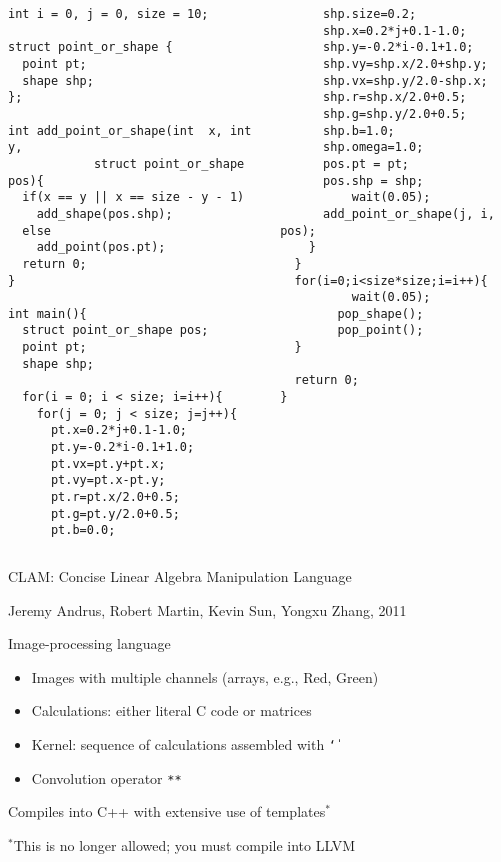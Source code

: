 \documentclass{plt}
\begin{document}
\begin{frame}[fragile]
\begin{columns}
\begin{column}{0.5\textwidth}
\fontsize{7pt}{7pt}\selectfont
\begin{verbatim}
int i = 0, j = 0, size = 10;

struct point_or_shape {
  point pt;
  shape shp;
};

int add_point_or_shape(int  x, int y,
            struct point_or_shape pos){
  if(x == y || x == size - y - 1)
    add_shape(pos.shp);
  else
    add_point(pos.pt);
  return 0;
}

int main(){
  struct point_or_shape pos;
  point pt;
  shape shp;

  for(i = 0; i < size; i=i++){
    for(j = 0; j < size; j=j++){
      pt.x=0.2*j+0.1-1.0;
      pt.y=-0.2*i-0.1+1.0;
      pt.vx=pt.y+pt.x;
      pt.vy=pt.x-pt.y;
      pt.r=pt.x/2.0+0.5;
      pt.g=pt.y/2.0+0.5;
      pt.b=0.0;
\end{verbatim}
\end{column}
\begin{column}{0.5\textwidth}
\fontsize{7pt}{7pt}\selectfont
\begin{verbatim}
      shp.size=0.2;
      shp.x=0.2*j+0.1-1.0;
      shp.y=-0.2*i-0.1+1.0;
      shp.vy=shp.x/2.0+shp.y;
      shp.vx=shp.y/2.0-shp.x;
      shp.r=shp.x/2.0+0.5;
      shp.g=shp.y/2.0+0.5;
      shp.b=1.0;
      shp.omega=1.0;
      pos.pt = pt;
      pos.shp = shp;
          wait(0.05);
      add_point_or_shape(j, i, pos);
    }
  }
  for(i=0;i<size*size;i=i++){
          wait(0.05);
        pop_shape();
        pop_point();
  }
 
  return 0;
}
\end{verbatim}
\end{column}
\end{columns}
\end{frame}

\begin{frame}{CLAM: Concise Linear Algebra Manipulation Language}

{\small Jeremy Andrus, Robert Martin, Kevin Sun, Yongxu Zhang, 2011}

Image-processing language

\begin{itemize}
\item Images with multiple channels (arrays, e.g., Red, Green)
\item Calculations: either literal C code or matrices
\item Kernel: sequence of calculations assembled with \texttt{\char`\|}
\item Convolution operator \texttt{**}
\end{itemize}

Compiles into C++ with extensive use of templates$^*$

$^*$This is no longer allowed; you must compile into LLVM

\end{frame}
\end{document}
